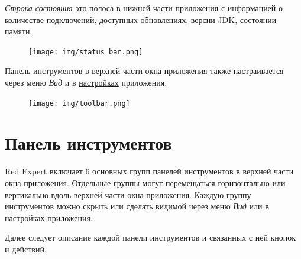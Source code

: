 \textit{Строка состояния} это полоса в нижней части приложения с информацией о количестве подключений, доступных обновлениях, версии JDK, состоянии памяти.

\begin{figure}[H]
	\centering
	\texttt{[image: img/status\_bar.png]}
\end{figure}

\hyperref[sec:toolbar]{Панель инструментов} в верхней части окна приложения также настраивается через меню \textit{Вид} и в \hyperref[sec:pref_toolbar]{настройках} приложения.

\begin{figure}[H]
	\centering
	\texttt{[image: img/toolbar.png]}
\end{figure}

\newpage
\section{Панель инструментов}\label{sec:toolbar}

Red Expert включает 6 основных групп панелей инструментов в верхней части окна приложения. Отдельные группы могут перемещаться горизонтально или вертикально вдоль верхней части окна приложения. Каждую группу инструментов можно скрыть или сделать видимой через меню \textit{Вид} или в настройках приложения.

Далее следует описание каждой панели инструментов и связанных с ней кнопок и действий. 


